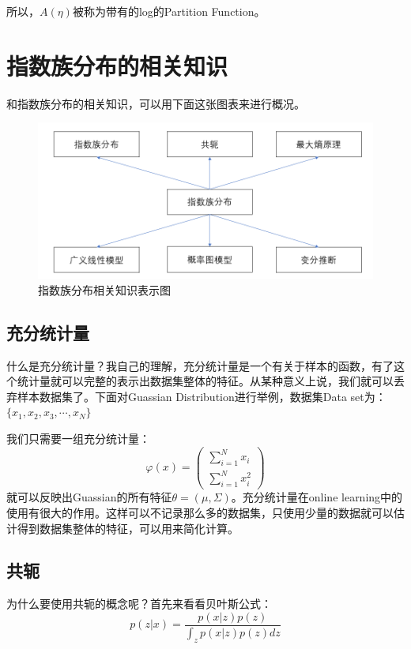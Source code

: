 \documentclass[a4paper]{article}
\begin{document}
所以，$A(\eta)$被称为带有的log的Partition Function。 

\section{指数族分布的相关知识}
和指数族分布的相关知识，可以用下面这张图表来进行概况。
\begin{figure}[H]
    \centering
    \includegraphics[width=.8\textwidth]{微信图片_20191022170308.png}
    \caption{指数族分布相关知识表示图}
    \label{fig:my_label_1}
\end{figure}

\subsection{充分统计量}
什么是充分统计量？我自己的理解，充分统计量是一个有关于样本的函数，有了这个统计量就可以完整的表示出数据集整体的特征。从某种意义上说，我们就可以丢弃样本数据集了。下面对Guassian Distribution进行举例，数据集Data set为：$\{x_1,x_2,x_3,\cdots ,x_N\}$

我们只需要一组充分统计量：
\begin{equation}
    \varphi(x) = 
    \begin{pmatrix}
        \sum_{i=1}^Nx_i \\
        \sum_{i=1}^Nx_i^2
    \end{pmatrix}
\end{equation}
就可以反映出Guassian的所有特征$\theta=(\mu, \Sigma)$。充分统计量在online learning中的使用有很大的作用。这样可以不记录那么多的数据集，只使用少量的数据就可以估计得到数据集整体的特征，可以用来简化计算。

\subsection{共轭}
为什么要使用共轭的概念呢？首先来看看贝叶斯公式：
\begin{equation}
    p(z|x)=\frac{p(x|z)p(z)}{\int_{z}p(x|z)p(z)dz}
\end{equation}
\end{document}
